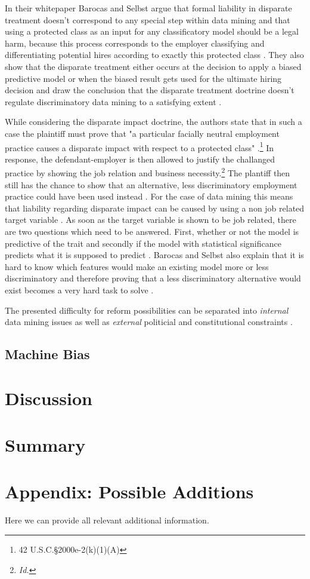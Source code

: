 \documentclass{article}
\begin{document}
In their whitepaper Barocas and Selbst argue that formal liability in disparate treatment doesn't correspond to any special step within data mining and that using a protected class as an input for any classificatory model should be a legal harm, because this process corresponds to the employer classifying and differentiating potential hires according to exactly this protected class \cite{Barocas.2016}. They also show that the disparate treatment either occurs at the decision to apply  a biased predictive model or when the biased result gets used for the ultimate hiring decision and draw the conclusion that the disparate treatment doctrine doesn't regulate discriminatory data mining to a satisfying extent \cite{Barocas.2016}. 

While considering the disparate impact doctrine, the authors state that in such a case the plaintiff must prove that "a particular facially neutral employment practice causes a disparate impact with respect to a protected class" \cite{Barocas.2016} \cite{titleVII}.\footnote{ 42 U.S.C.§2000e-2(k)(1)(A) } In response, the defendant-employer is then allowed to justify the challanged practice by showing the job relation and business necessity.\footnote{ \textit{Id.} } The plantiff then still has the chance to show that an alternative, less discriminatory employment practice could have been used instead \cite{Barocas.2016}. For the case of data mining this means that liability regarding disparate impact can be caused by using a non job related target variable \cite{Barocas.2016}. As soon as the target variable is shown to be job related, there are two questions which need to be answered. First, whether or not the model is predictive of the trait and secondly if the model with statistical significance predicts what it is supposed to predict \cite{Barocas.2016}. Barocas and Selbst also explain that it is hard to know which features would make an existing model more or less discriminatory and therefore proving that a less discriminatory alternative would exist becomes a very hard task to solve \cite{Barocas.2016}.

The presented difficulty for reform possibilities can be separated into \textit{internal} data mining issues as well as \textit{external} politicial and constitutional  constraints \cite{Barocas.2016}. 

\subsection{Machine Bias}


\section{Discussion}


\section{Summary}


\section{Appendix: Possible Additions}
Here we can provide all relevant additional information.


\medskip
\small


\end{document}
